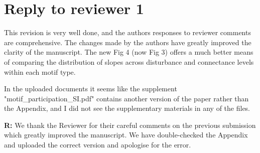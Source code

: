 \documentclass[12pt]{article}
\newenvironment{refquote}{\bigskip \begin{it}}{\end{it}\medskip}
\begin{document}
\clearpage


\section*{Reply to reviewer 1}

    \begin{refquote}

        This revision is very well done, and the authors responses to reviewer comments are comprehensive. The changes made by the authors have greatly improved the clarity of the manuscript. The new Fig 4 (now Fig 3) offers a much better means of comparing the distribution of slopes across disturbance and connectance levels within each motif type.

        In the uploaded documents it seems like the supplement "motif_participation_SI.pdf" contains  another version of the paper rather than the Appendix, and I did not see the supplementary materials in any of the files.

    \end{refquote}

    \textbf{R:} We thank the Reviewer for their careful comments on the previous submission which greatly improved the manuscript. We have double-checked the Appendix and uploaded the correct version and apologise for the error.


\clearpage

\clearpage

     
\end{document}

